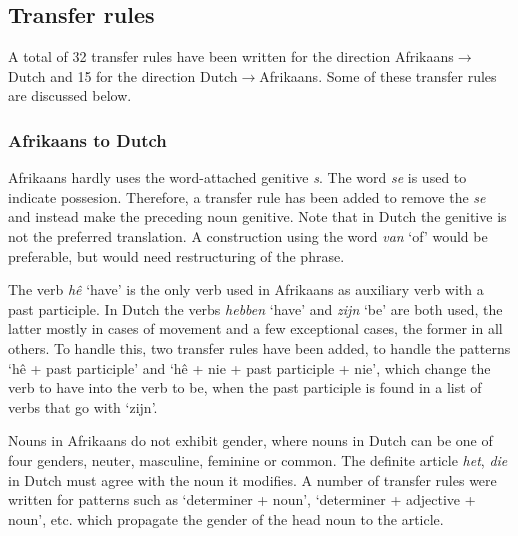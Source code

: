 \documentclass[11pt]{article}
\begin{document}
\subsection{Transfer rules}

A total of 32 transfer rules have been written for the direction Afrikaans$\rightarrow$Dutch and
15 for the direction Dutch$\rightarrow$Afrikaans. Some of these transfer rules are discussed 
below.

\subsubsection{Afrikaans to Dutch}


Afrikaans hardly uses the word-attached genitive \cite{Donaldson:93} \emph{s}. The word \emph{se} is used to indicate possesion. 
Therefore, a transfer rule has been added to remove the \emph{se} and instead make the preceding
noun genitive. Note that in Dutch the genitive is not the preferred translation. A construction using
the word \emph{van} `of' would be preferable, but would need restructuring of the phrase. 


The verb \emph{hê} `have' is the only verb used in Afrikaans as auxiliary
verb with a past participle. In Dutch the verbs \emph{hebben} `have' and \emph{zijn} `be' 
are both used, the latter mostly in cases of movement and a few exceptional cases, the
former in all others. To handle this, two transfer rules have been added, to handle the
patterns `hê + past participle' and `hê + nie + past participle + nie', which change the
verb to have into the verb to be, when the past participle is found in a list of verbs that go with
`zijn'.



Nouns in Afrikaans do not exhibit gender, where nouns in Dutch can be one of four genders,
neuter, masculine, feminine or common. The definite article \emph{het}, \emph{die} in Dutch must agree with 
the noun it modifies. A number of transfer rules were written for patterns such as `determiner + noun',
`determiner + adjective + noun', etc. which propagate the gender of the head noun to the article.
\end{document}
